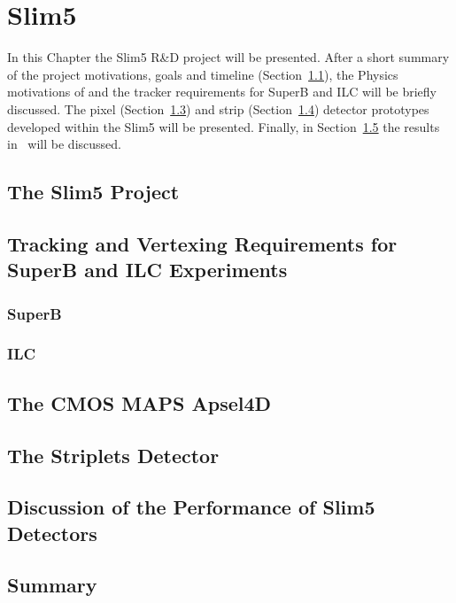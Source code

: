 \chapter{Slim5}
\label{chap:Slim5}

In this Chapter the Slim5 R\&D project will be presented. After a short summary of the project 
motivations, goals and timeline (Section~\ref{sec:Slim5Project}), the Physics motivations of 
and the tracker requirements for SuperB and ILC will be briefly discussed. 
The pixel  (Section~\ref{sec:Apsel4D}) and strip (Section~\ref{sec:Striplets}) 
detector prototypes developed 
within the Slim5 will be presented. Finally, in Section~\ref{sec:Slim5Results} the results 
in~\cite{BETTARINI2010942,BOMBEN2010159} will be discussed.


\section{The Slim5 Project}
\label{sec:Slim5Project}

\section{Tracking and Vertexing Requirements for SuperB and ILC Experiments}
\cite{ILCVertexing2007}

\subsection{SuperB}
\subsection{ILC}


\section{The CMOS MAPS Apsel4D}
\label{sec:Apsel4D}

\section{The Striplets Detector}
\label{sec:Striplets}

\section{Discussion of the Performance of Slim5 Detectors}
\label{sec:Slim5Results}

\section{Summary}

